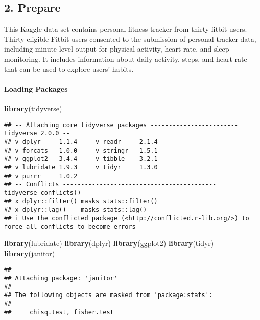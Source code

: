 \documentclass[
]{article}
\newenvironment{Shaded}{\begin{snugshade}}{\end{snugshade}}
\newcommand{\FunctionTok}[1]{\textcolor[rgb]{0.13,0.29,0.53}{\textbf{#1}}}
\newcommand{\NormalTok}[1]{#1}
\begin{document}
\hypertarget{prepare}{%
\subsection{2. Prepare}\label{prepare}}

This Kaggle data set contains personal fitness tracker from thirty
fitbit users. Thirty eligible Fitbit users consented to the submission
of personal tracker data, including minute-level output for physical
activity, heart rate, and sleep monitoring. It includes information
about daily activity, steps, and heart rate that can be used to explore
users' habits.

\hypertarget{loading-packages}{%
\paragraph{Loading Packages}\label{loading-packages}}

\begin{Shaded}
\begin{Highlighting}[]
\FunctionTok{library}\NormalTok{(tidyverse)}
\end{Highlighting}
\end{Shaded}

\begin{verbatim}
## -- Attaching core tidyverse packages ------------------------ tidyverse 2.0.0 --
## v dplyr     1.1.4     v readr     2.1.4
## v forcats   1.0.0     v stringr   1.5.1
## v ggplot2   3.4.4     v tibble    3.2.1
## v lubridate 1.9.3     v tidyr     1.3.0
## v purrr     1.0.2     
## -- Conflicts ------------------------------------------ tidyverse_conflicts() --
## x dplyr::filter() masks stats::filter()
## x dplyr::lag()    masks stats::lag()
## i Use the conflicted package (<http://conflicted.r-lib.org/>) to force all conflicts to become errors
\end{verbatim}

\begin{Shaded}
\begin{Highlighting}[]
\FunctionTok{library}\NormalTok{(lubridate) }
\FunctionTok{library}\NormalTok{(dplyr)}
\FunctionTok{library}\NormalTok{(ggplot2)}
\FunctionTok{library}\NormalTok{(tidyr)}
\FunctionTok{library}\NormalTok{(janitor)}
\end{Highlighting}
\end{Shaded}

\begin{verbatim}
## 
## Attaching package: 'janitor'
## 
## The following objects are masked from 'package:stats':
## 
##     chisq.test, fisher.test
\end{verbatim}
\end{document}
